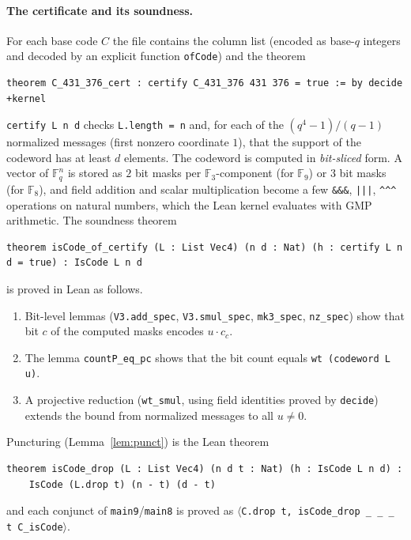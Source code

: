 \documentclass[11pt]{article}
\numberwithin{equation}{section}
\theoremstyle{definition}
\theoremstyle{remark}
\newcommand{\F}{\mathbb F}
\begin{document}
\paragraph{The certificate and its soundness.} For each base code $C$ the file contains the column list
(encoded as base-$q$ integers and decoded by an explicit function \texttt{ofCode}) and the theorem
\begin{lstlisting}
theorem C_431_376_cert : certify C_431_376 431 376 = true := by decide +kernel
\end{lstlisting}
\texttt{certify L n d} checks \texttt{L.length = n} and, for each of the $(q^4-1)/(q-1)$ normalized
messages (first nonzero coordinate $1$), that the support of the codeword has at least $d$ elements.
The codeword is computed in \emph{bit-sliced} form. A vector of $\F_q^n$ is stored as $2$ bit masks per
$\F_3$-component (for $\F_9$) or $3$ bit masks (for $\F_8$), and field addition and scalar
multiplication become a few \texttt{\&\&\&}, \texttt{|||}, \texttt{\^{}\^{}\^{}} operations on natural
numbers, which the Lean kernel evaluates with GMP arithmetic. The soundness theorem
\begin{lstlisting}
theorem isCode_of_certify (L : List Vec4) (n d : Nat) (h : certify L n d = true) : IsCode L n d
\end{lstlisting}
is proved in Lean as follows.
\begin{enumerate}
\item Bit-level lemmas (\texttt{V3.add\_spec}, \texttt{V3.smul\_spec}, \texttt{mk3\_spec},
\texttt{nz\_spec}) show that bit $c$ of the computed masks encodes $u\cdot c_c$.
\item The lemma \texttt{countP\_eq\_pc} shows that the bit count equals \texttt{wt (codeword L u)}.
\item A projective reduction (\texttt{wt\_smul}, using field identities proved by \texttt{decide}) extends
the bound from normalized messages to all $u\neq0$.
\end{enumerate}
Puncturing (Lemma~\ref{lem:punct}) is the Lean theorem
\begin{lstlisting}
theorem isCode_drop (L : List Vec4) (n d t : Nat) (h : IsCode L n d) :
    IsCode (L.drop t) (n - t) (d - t)
\end{lstlisting}
and each conjunct of \texttt{main9}/\texttt{main8} is proved as
$\langle$\texttt{C.drop t, isCode\_drop \_ \_ \_ t C\_isCode}$\rangle$.
\end{document}
